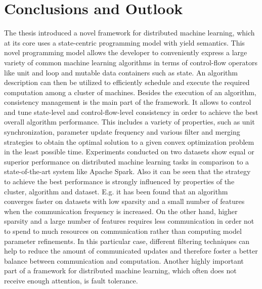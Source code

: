 
\chapter{Conclusions and Outlook}
\label{c:conclusion}
The thesis introduced a novel framework for distributed machine learning, which at its core uses a state-centric programming model with yield semantics.
This novel programming model allows the developer to conveniently express a large variety of common machine learning algorithms in terms of control-flow operators like unit and loop and mutable data containers such as state.
An algorithm description can then be utilized to efficiently schedule and execute the required computation among a cluster of machines.
Besides the execution of an algorithm, consistency management is the main part of the framework.
It allows to control and tune state-level and control-flow-level consistency in order to achieve the best overall algorithm performance.
This includes a variety of properties, such as unit synchronization, parameter update frequency and various filter and merging strategies to obtain the optimal solution to a given convex optimization problem in the least possible time.
Experiments conducted on two datasets show equal or superior performance on distributed machine learning tasks in comparison to a state-of-the-art system like Apache Spark.
Also it can be seen that the strategy to achieve the best performance is strongly influenced by properties of the cluster, algorithm and dataset.
E.g. it has been found that an algorithm converges faster on datasets with low sparsity and a small number of features when the communication frequency is increased.
On the other hand, higher sparsity and a large number of features requires less communication in order not to spend to much resources on communication rather than computing model parameter refinements.
In this particular case, different filtering techniques can help to reduce the amount of communicated updates and therefore foster a better balance between communication and computation.
Another highly important part of a framework for distributed machine learning, which often does not receive enough attention, is fault tolerance.

